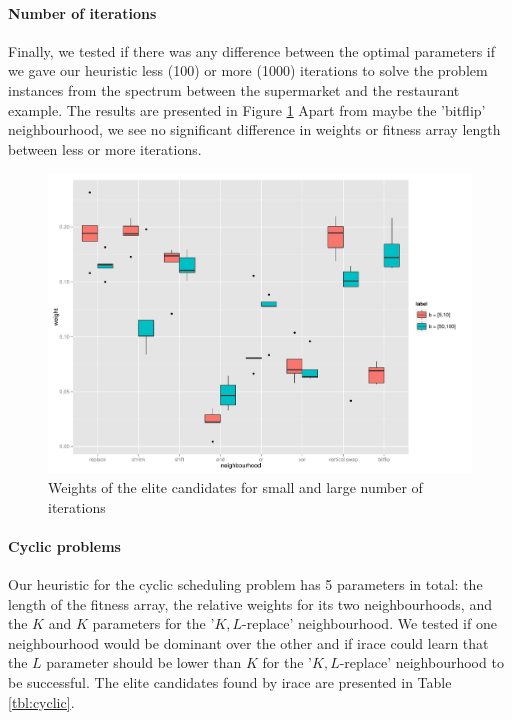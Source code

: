 \documentclass[]{article}
\begin{document}
\paragraph{Number of iterations}
Finally, we tested if there was any difference between the optimal parameters if we gave our heuristic less (100) or more (1000) iterations to solve the problem instances from the spectrum between the supermarket and the restaurant example. The results are presented in Figure \ref{fig:iterations} Apart from maybe the 'bitflip' neighbourhood, we see no significant difference in weights or fitness array length between less or more iterations.

\begin{figure}
	\includegraphics[width=\textwidth]{boxplot_iteration.pdf}
	\caption{Weights of the elite candidates for small and large number of iterations}
	\label{fig:iterations}
\end{figure}

\paragraph{Cyclic problems}
Our heuristic for the cyclic scheduling problem has 5 parameters in total: the length of the fitness array, the relative weights for its two neighbourhoods, and the $K$ and $K$ parameters for the '$K,L$-replace' neighbourhood. We tested if one neighbourhood would be dominant over the other and if irace could learn that the $L$ parameter should be lower than $K$ for the '$K,L$-replace' neighbourhood to be successful. The elite candidates found by irace are presented in Table \ref{tbl:cyclic}.
\end{document}
